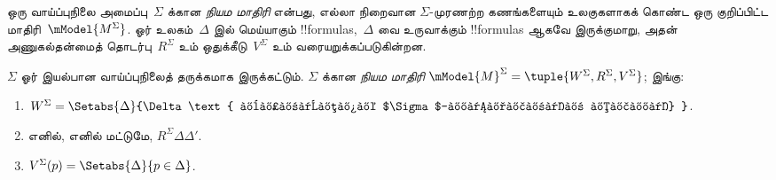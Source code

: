 \documentclass[../../../include/open-logic-section]{subfiles}
\begin{document}


ஒரு வாய்ப்புநிலை அமைப்பு~$\Sigma$ க்கான \emph{நியம மாதிரி} என்பது,
எல்லா நிறைவான $\Sigma$-முரணற்ற கணங்களையும் உலகுகளாகக் கொண்ட ஒரு
குறிப்பிட்ட மாதிரி~$\mModel{M^\Sigma}$. ஓர் உலகம்~$\Delta$ இல் மெய்யாகும்
!!{formula}s,~$\Delta$ வை உருவாக்கும் !!{formula}s ஆகவே இருக்குமாறு,
அதன் அணுகல்தன்மைத் தொடர்பு~$R^\Sigma$ உம் ஒதுக்கீடு~$V^\Sigma$ உம்
வரையறுக்கப்படுகின்றன.

\begin{defn}
  $\Sigma$ ஓர் இயல்பான வாய்ப்புநிலைத் தருக்கமாக இருக்கட்டும்.
  $\Sigma$ க்கான \emph{நியம மாதிரி} $\mModel{M}^\Sigma =
  \tuple{W^\Sigma, R^\Sigma, V^\Sigma}$; இங்கு:
  \begin{enumerate}
  \item $W^\Sigma = \Setabs{ \Delta }{\Delta \text{ நிறைவான
      $\Sigma$-முரணற்ற கணம்} }$.
  \item {} எனில், எனில்
      மட்டுமே, $R^\Sigma \Delta\Delta'$.
  \item $V^\Sigma(p) = \Setabs{\Delta}{p \in \Delta}$.
  \end{enumerate}
\end{defn}
\end{document}
